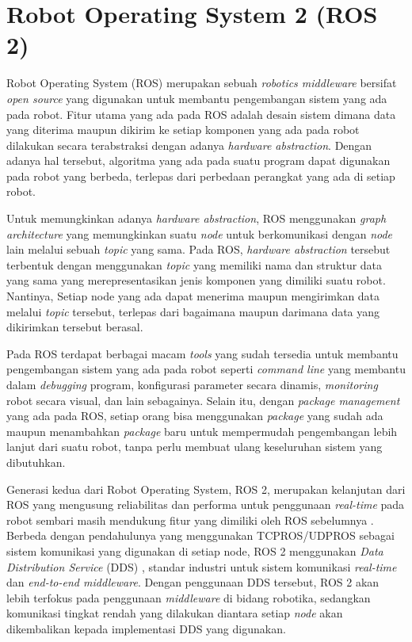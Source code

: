 \section{Robot Operating System 2 (ROS 2)}
\label{sec:ros2}

Robot Operating System (ROS) \citep{cit:quigley2009} merupakan sebuah \emph{robotics middleware} bersifat \emph{open source} yang digunakan untuk membantu pengembangan sistem yang ada pada robot.
Fitur utama yang ada pada ROS adalah desain sistem dimana data yang diterima maupun dikirim ke setiap komponen yang ada pada robot dilakukan secara terabstraksi dengan adanya \emph{hardware abstraction}.
Dengan adanya hal tersebut,
	algoritma yang ada pada suatu program dapat digunakan pada robot yang berbeda,
	terlepas dari perbedaan perangkat yang ada di setiap robot.

Untuk memungkinkan adanya \emph{hardware abstraction},
	ROS menggunakan \emph{graph architecture} yang memungkinkan suatu \emph{node} untuk berkomunikasi dengan \emph{node} lain melalui sebuah \emph{topic} yang sama.
Pada ROS, \emph{hardware abstraction} tersebut terbentuk dengan menggunakan \emph{topic} yang memiliki nama dan struktur data yang sama yang merepresentasikan jenis komponen yang dimiliki suatu robot.
Nantinya, Setiap node yang ada dapat menerima maupun mengirimkan data melalui \emph{topic} tersebut,
	terlepas dari bagaimana maupun darimana data yang dikirimkan tersebut berasal.

Pada ROS terdapat berbagai macam \emph{tools} yang sudah tersedia untuk membantu pengembangan sistem yang ada pada robot seperti \emph{command line} yang membantu dalam \emph{debugging} program,
	konfigurasi parameter secara dinamis,
	\emph{monitoring} robot secara visual, dan lain sebagainya.
Selain itu, dengan \emph{package management} yang ada pada ROS,
	setiap orang bisa menggunakan \emph{package} yang sudah ada maupun menambahkan \emph{package} baru untuk mempermudah pengembangan lebih lanjut dari suatu robot,
	tanpa perlu membuat ulang keseluruhan sistem yang dibutuhkan.

Generasi kedua dari Robot Operating System, ROS 2,
	merupakan kelanjutan dari ROS yang mengusung reliabilitas dan performa untuk penggunaan \emph{real-time} pada robot sembari masih mendukung fitur yang dimiliki oleh ROS sebelumnya \citep{cit:maruyama2016}.
Berbeda dengan pendahulunya yang menggunakan TCPROS/UDPROS sebagai sistem komunikasi yang digunakan di setiap node,
	ROS 2 menggunakan \emph{Data Distribution Service} (DDS) \citep{cit:castellote2003} \citep{cit:schlesselman2004}, standar industri untuk sistem komunikasi \emph{real-time} dan \emph{end-to-end middleware}.
Dengan penggunaan DDS tersebut, ROS 2 akan lebih terfokus pada penggunaan \emph{middleware} di bidang robotika,
	sedangkan komunikasi tingkat rendah yang dilakukan diantara setiap \emph{node} akan dikembalikan kepada implementasi DDS yang digunakan.

